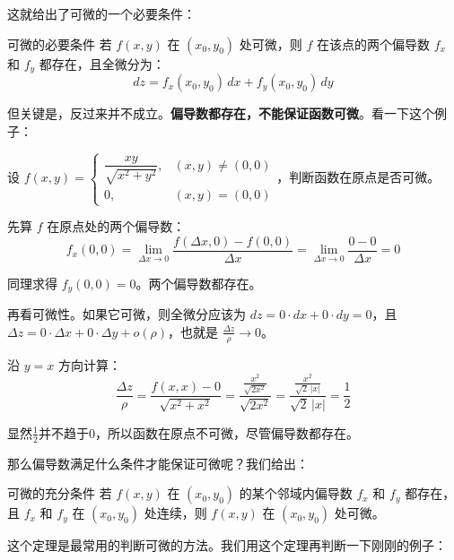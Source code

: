 这就给出了可微的一个必要条件：

\begin{theorem}{可微的必要条件}{}
若 $f(x, y)$ 在 $(x_0, y_0)$ 处可微，则 $f$ 在该点的两个偏导数 $f_x$ 和 $f_y$ 都存在，且全微分为：
\[
dz = f_x(x_0, y_0)\, dx + f_y(x_0, y_0)\, dy
\]
\end{theorem}

但关键是，反过来并不成立。\textbf{偏导数都存在，不能保证函数可微}。看一下这个例子：

\begin{myexample}
  设 $f(x, y) = \begin{cases}
    \dfrac{xy}{\sqrt{x^2 + y^2}}, & (x, y) \neq (0, 0) \\
    0, & (x, y) = (0, 0)
  \end{cases}$，判断函数在原点是否可微。

  先算 $f$ 在原点处的两个偏导数：
  \[
  f_x(0, 0) = \lim_{\Delta x \to 0} \frac{f(\Delta x, 0) - f(0, 0)}{\Delta x}
  = \lim_{\Delta x \to 0} \frac{0 - 0}{\Delta x} = 0
  \]

  同理求得 $f_y(0, 0) = 0$。两个偏导数都存在。

  再看可微性。如果它可微，则全微分应该为 $dz = 0 \cdot dx + 0 \cdot dy = 0$，且 $\Delta z = 0 \cdot \Delta x + 0 \cdot \Delta y + o(\rho)$，也就是 $\frac{\Delta z}{\rho} \to 0$。

  沿 $y = x$ 方向计算：
  \[
  \frac{\Delta z}{\rho} = \frac{f(x, x) - 0}{\sqrt{x^2 + x^2}}
  = \frac{\frac{x^2}{\sqrt{2x^2}}}{\sqrt{2x^2}}
  = \frac{\frac{x^2}{\sqrt{2}\,|x|}}{\sqrt{2}\,|x|}
  = \frac{1}{2}
  \]

  显然$\frac{1}{2}$并不趋于$0$，所以函数在原点不可微，尽管偏导数都存在。
\end{myexample}

那么偏导数满足什么条件才能保证可微呢？我们给出：

\begin{theorem}{可微的充分条件}{}
若 $f(x, y)$ 在 $(x_0, y_0)$ 的某个邻域内偏导数 $f_x$ 和 $f_y$ 都存在，且 $f_x$ 和 $f_y$ 在 $(x_0, y_0)$ 处连续，则 $f(x, y)$ 在 $(x_0, y_0)$ 处可微。
\end{theorem}

这个定理是最常用的判断可微的方法。我们用这个定理再判断一下刚刚的例子：

